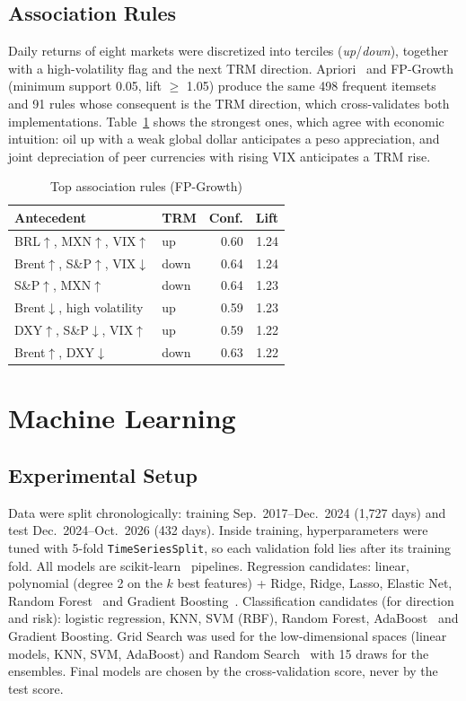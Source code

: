 \documentclass[conference]{IEEEtran}
\begin{document}
\subsection{Association Rules}
Daily returns of eight markets were discretized into terciles (\emph{up}/\emph{down}), together with a high-volatility flag and the next TRM direction. Apriori~\cite{agrawal1994} and FP-Growth~\cite{han2000} (minimum support 0.05, lift $\geq$ 1.05) produce the same 498 frequent itemsets and 91 rules whose consequent is the TRM direction, which cross-validates both implementations. Table~\ref{tab:rules} shows the strongest ones, which agree with economic intuition: oil up with a weak global dollar anticipates a peso appreciation, and joint depreciation of peer currencies with rising VIX anticipates a TRM rise.

\begin{table}[t]
\caption{Top association rules (FP-Growth)}
\label{tab:rules}
\centering
\footnotesize
\begin{tabular}{@{}p{3.6cm}p{0.9cm}rr@{}}
\toprule
Antecedent & TRM & Conf. & Lift \\
\midrule
BRL$\uparrow$, MXN$\uparrow$, VIX$\uparrow$ & up & 0.60 & 1.24 \\
Brent$\uparrow$, S\&P$\uparrow$, VIX$\downarrow$ & down & 0.64 & 1.24 \\
S\&P$\uparrow$, MXN$\uparrow$ & down & 0.64 & 1.23 \\
Brent$\downarrow$, high volatility & up & 0.59 & 1.23 \\
DXY$\uparrow$, S\&P$\downarrow$, VIX$\uparrow$ & up & 0.59 & 1.22 \\
Brent$\uparrow$, DXY$\downarrow$ & down & 0.63 & 1.22 \\
\bottomrule
\end{tabular}
\end{table}

\section{Machine Learning}
\subsection{Experimental Setup}
Data were split chronologically: training Sep.~2017--Dec.~2024 (1{,}727 days) and test Dec.~2024--Oct.~2026 (432 days). Inside training, hyperparameters were tuned with 5-fold \texttt{TimeSeriesSplit}, so each validation fold lies after its training fold. All models are scikit-learn~\cite{pedregosa2011} pipelines. Regression candidates: linear, polynomial (degree 2 on the $k$ best features) + Ridge, Ridge, Lasso, Elastic Net, Random Forest~\cite{breiman2001} and Gradient Boosting~\cite{friedman2001}. Classification candidates (for direction and risk): logistic regression, KNN, SVM (RBF), Random Forest, AdaBoost~\cite{freund1997} and Gradient Boosting. Grid Search was used for the low-dimensional spaces (linear models, KNN, SVM, AdaBoost) and Random Search~\cite{bergstra2012} with 15 draws for the ensembles. Final models are chosen by the cross-validation score, never by the test score.
\end{document}
